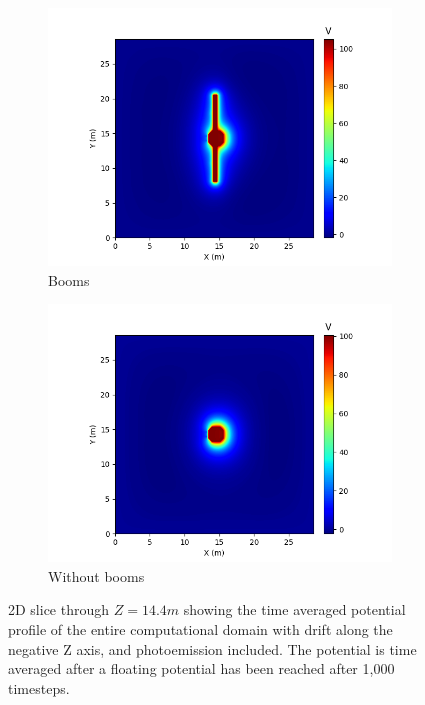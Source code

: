 \begin{figure}[H]
  \begin{subfigure}[b]{0.6\textwidth}
    \includegraphics[width=\textwidth]{figures/MMO/minZ/WB/P_minZ_WB.png}
    \caption{Booms}
    \label{fig:P_minZ_WB}
  \end{subfigure}
  \hfill
  \begin{subfigure}[b]{0.6\textwidth}
    \includegraphics[width=\textwidth]{figures/MMO/minZ/NB/P_minZ_NB.png}
    \caption{Without booms}
    \label{fig:P_minZ_NB}
  \end{subfigure}
  \label{fig:Pot_minZ}
  \caption{2D slice through $Z = 14.4 m$ showing the time averaged potential profile of the entire computational domain with drift along the negative Z axis, and photoemission included. The potential is time averaged after a floating potential has been reached after 1,000 timesteps.}
\end{figure}

